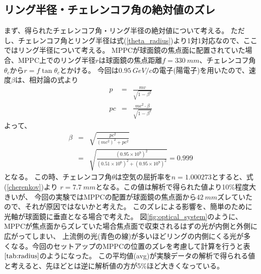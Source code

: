 \documentclass[uplatex, titlepage, dvipdfmx, 12pt, a4paper]{jsreport}
\begin{document}
    \subsection{リング半径・チェレンコフ角の絶対値のズレ}
    まず、得られたチェレンコフ角・リング半径の絶対値について考える。
    ただし、チェレンコフ角とリング半径は式(\ref{theta_radius})より1対1対応なので、ここではリング半径について考える。
    MPPCが球面鏡の焦点面に配置されていた場合、MPPC上でのリング半径$r$は球面鏡の焦点距離$f=\SI{330}{mm}$、チェレンコフ角$\theta_{c}$から$r=f\tan{\theta_{c}}$とかける。
    今回は$\SI{0.95}{GeV/c}$の電子(陽電子)を用いたので、速度$\beta$は、相対論の式より
    \begin{eqnarray}
      p &=& \frac{mv}{\sqrt{1-{\beta}^2}} \nonumber \\
      pc &=& \frac{mc^2\cdot \beta}{\sqrt{1-{\beta}^2}} \nonumber 
    \end{eqnarray}
    よって、
    \begin{eqnarray}
      \beta &=& \sqrt{\frac{{pc}^2}{\left(mc^2\right)^2 + {pc}^2}} \nonumber \\
      &=& \sqrt{\frac{\left(0.95\times 10^9\right)^2}{\left(0.51\times 10^6\right)^2 + \left(0.95\times 10^9\right)^2}} = 0.999 \nonumber
    \end{eqnarray}
    となる。
    この時、チェレンコフ角$\theta$は空気の屈折率を$n=1.000273$とすると、式(\ref{cherenkov})より
    $r=\SI{7.7}{mm}$となる。この値は解析で得られた値より10\%程度大きいが、
    今回の実験ではMPPCの配置が球面鏡の焦点面から$\SI{42}{mm}$ズレていたので、それが原因ではないかと考えた。
    このズレによる影響を、簡単のために光軸が球面鏡に垂直となる場合で考えた。
    図\ref{fig:optical_system}のように、MPPCが焦点面からズレていた場合焦点面で収束されるはずの光が内側と外側に広がってしまい、
    上流側の光(青色の線)が多いほどリングの内側にくる光が多くなる。今回のセットアップのMPPCの位置のズレを考慮して計算を行うと表$\ref{tab:radius}$のようになった。
    この平均値(avg)が実験データの解析で得られる値と考えると、先ほどとは逆に解析値の方が5\%ほど大きくなっている。\\
\end{document}
